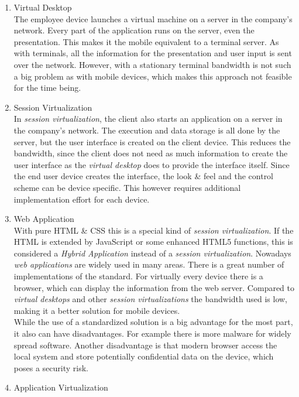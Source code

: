 \begin{enumerate}
	\item Virtual Desktop \\
	The employee device launches a virtual machine on a server in the company's network. Every part of the application runs on the server, even the presentation. This makes it the mobile equivalent to a terminal server. As with terminals, all the information for the presentation and user input is sent over the network. However, with a stationary terminal bandwidth is not such a big problem as with mobile devices, which makes this approach not feasible for the time being.  \parencite{Disterer.2013}
	\item Session Virtualization \\
	In \textit{session virtualization}, the client also starts an application on a server in the company's network. The execution and data storage is all done by the server, but the user interface is created on the client device. This reduces the bandwidth, since the client does not need as much information to create the user interface as the \textit{virtual desktop} does to provide the interface itself. Since the end user device creates the interface, the look \& feel and the control scheme can be device specific. This however requires additional implementation effort for each device. \parencite{Disterer.2013}
	\item Web Application \\
	With pure HTML \& CSS this is a special kind of \textit{session virtualization}. If the HTML is extended by JavaScript or some enhanced HTML5 functions, this is considered a \textit{Hybrid Application} instead of a \textit{session virtualization}. Nowadays \textit{web applications} are widely used in many areas. There is a great number of implementations of the standard. For virtually every device there is a browser, which can display the information from the web server. Compared to \textit{virtual desktops} and other \textit{session virtualizations} the bandwidth used is low, making it a better solution for mobile devices. \\
	While the use of a standardized solution is a big advantage for the most part, it also can have disadvantages. For example there is more malware for widely spread software. Another disadvantage is that modern browser access the local system and store potentially confidential data on the device, which poses a security risk. \parencite{Disterer.2013}
	\item Application Virtualization \\

\end{enumerate}
